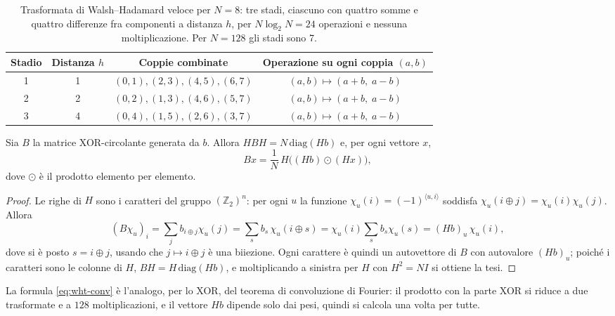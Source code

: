 \begin{table}[H]
\centering
\small
\renewcommand{\arraystretch}{1.2}
\begin{tabular}{cccc}
\toprule
Stadio & Distanza $h$ & Coppie combinate & Operazione su ogni coppia $(a,b)$ \\
\midrule
\rowcolor{steraBlu!10} 1 & 1 & $(0,1),(2,3),(4,5),(6,7)$ & $(a,b)\mapsto(a+b,\;a-b)$ \\
2 & 2 & $(0,2),(1,3),(4,6),(5,7)$ & $(a,b)\mapsto(a+b,\;a-b)$ \\
\rowcolor{steraBlu!10} 3 & 4 & $(0,4),(1,5),(2,6),(3,7)$ & $(a,b)\mapsto(a+b,\;a-b)$ \\
\bottomrule
\end{tabular}
\caption{Trasformata di Walsh--Hadamard veloce per $N=8$: tre stadi, ciascuno con quattro somme e quattro differenze fra componenti a distanza $h$, per $N\log_2N=24$ operazioni e nessuna moltiplicazione. Per $N=128$ gli stadi sono 7.}
\label{tab:wht}
\end{table}

\begin{proposizione}
Sia $B$ la matrice XOR-circolante generata da $b$. Allora $H B H = N\,\mathrm{diag}(Hb)$ e, per ogni vettore $x$,
\begin{equation}
Bx = \frac{1}{N}\,H\big((Hb)\odot(Hx)\big),
\label{eq:wht-conv}
\end{equation}
dove $\odot$ è il prodotto elemento per elemento.
\end{proposizione}

\begin{proof}
Le righe di $H$ sono i caratteri del gruppo $(\mathbb{Z}_2)^n$: per ogni $u$ la funzione $\chi_u(i)=(-1)^{\langle u,i\rangle}$ soddisfa $\chi_u(i\oplus j)=\chi_u(i)\chi_u(j)$. Allora
\[
(B\chi_u)_i = \sum_j b_{i\oplus j}\chi_u(j) = \sum_s b_s\,\chi_u(i\oplus s) = \chi_u(i)\sum_s b_s\chi_u(s) = (Hb)_u\,\chi_u(i),
\]
dove si è posto $s=i\oplus j$, usando che $j\mapsto i\oplus j$ è una biiezione. Ogni carattere è quindi un autovettore di $B$ con autovalore $(Hb)_u$; poiché i caratteri sono le colonne di $H$, $BH = H\,\mathrm{diag}(Hb)$, e moltiplicando a sinistra per $H$ con $H^2=NI$ si ottiene la tesi.
\end{proof}

La formula \eqref{eq:wht-conv} è l'analogo, per lo XOR, del teorema di convoluzione di Fourier: il prodotto con la parte XOR si riduce a due trasformate e a $128$ moltiplicazioni, e il vettore $Hb$ dipende solo dai pesi, quindi si calcola una volta per tutte.

